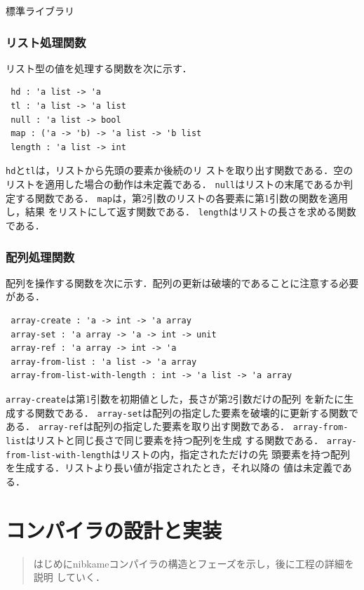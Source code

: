 \documentclass[a4paper,titlepage,report,disablejfam]{jsbook}
\begin{document}
\begin{resbonsiblesection}{標準ライブラリ}{\kobori}
\subsection{リスト処理関数}
リスト型の値を処理する関数を次に示す．
\begin{lstlisting}
 hd : 'a list -> 'a
 tl : 'a list -> 'a list
 null : 'a list -> bool
 map : ('a -> 'b) -> 'a list -> 'b list
 length : 'a list -> int
\end{lstlisting}
\lstinline|hd|と\lstinline|tl|は，リストから先頭の要素か後続のリ
ストを取り出す関数である．空のリストを適用した場合の動作は未定義である．
\lstinline|null|はリストの末尾であるか判定する関数である．
\lstinline|map|は，第2引数のリストの各要素に第1引数の関数を適用し，結果
をリストにして返す関数である．
\lstinline|length|はリストの長さを求める関数である．

\subsection{配列処理関数}
配列を操作する関数を次に示す．配列の更新は破壊的であることに注意する必要
がある．
\begin{lstlisting}
 array-create : 'a -> int -> 'a array
 array-set : 'a array -> 'a -> int -> unit
 array-ref : 'a array -> int -> 'a
 array-from-list : 'a list -> 'a array
 array-from-list-with-length : int -> 'a list -> 'a array
\end{lstlisting}
\lstinline|array-create|は第1引数を初期値とした，長さが第2引数だけの配列
を新たに生成する関数である．
\lstinline|array-set|は配列の指定した要素を破壊的に更新する関数である．
\lstinline|array-ref|は配列の指定した要素を取り出す関数である．
\lstinline|array-from-list|はリストと同じ長さで同じ要素を持つ配列を生成
する関数である．
\lstinline|array-from-list-with-length|はリストの内，指定されただけの先
頭要素を持つ配列を生成する．リストより長い値が指定されたとき，それ以降の%
値は未定義である．

\end{resbonsiblesection}

\chapter{コンパイラの設計と実装}\label{ch:impl}

\begin{abstract}
はじめにnibkameコンパイラの構造とフェーズを示し，後に工程の詳細を説明
していく．
\end{abstract}
\end{document}
